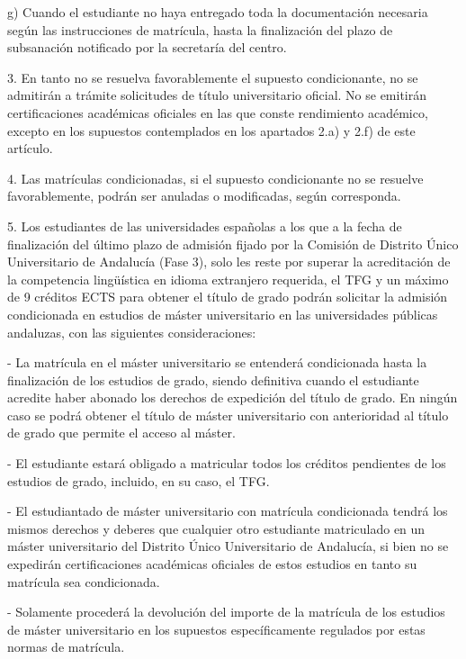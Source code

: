 \documentclass{article}
\begin{document}
\begin{itemize}
\begin{itemize}
\begin{scriptsize}
                  g) Cuando el estudiante no haya entregado toda la documentación necesaria según las instrucciones de matrícula, hasta la finalización del plazo de subsanación notificado por la secretaría del centro.

                  3. En tanto no se resuelva favorablemente el supuesto condicionante, no se admitirán a trámite solicitudes de título universitario oficial. No se emitirán certificaciones académicas oficiales en las que conste rendimiento académico, excepto en los supuestos contemplados en los apartados 2.a) y 2.f) de este artículo.

                  4. Las matrículas condicionadas, si el supuesto condicionante no se resuelve favorablemente, podrán ser anuladas o modificadas, según corresponda.

                  5. Los estudiantes de las universidades españolas a los que a la fecha de finalización del último plazo de admisión fijado por la Comisión de Distrito Único Universitario de Andalucía (Fase 3), solo les reste por superar la acreditación de la competencia lingüística en idioma extranjero requerida, el TFG y un máximo de 9 créditos ECTS para obtener el título de grado podrán solicitar la admisión condicionada en estudios de máster universitario en las universidades públicas andaluzas, con las siguientes consideraciones:

                  - La matrícula en el máster universitario se entenderá condicionada hasta la finalización de los estudios de grado, siendo definitiva cuando el estudiante acredite haber abonado los derechos de expedición del título de grado. En ningún caso se podrá obtener el título de máster universitario con anterioridad al título de grado que permite el acceso al máster.

                  - El estudiante estará obligado a matricular todos los créditos pendientes de los estudios de grado, incluido, en su caso, el TFG.

                  - El estudiantado de máster universitario con matrícula condicionada tendrá los mismos derechos y deberes que cualquier otro estudiante matriculado en un máster universitario del Distrito Único Universitario de Andalucía, si bien no se expedirán certificaciones académicas oficiales de estos estudios en tanto su matrícula sea condicionada.

                  - Solamente procederá la devolución del importe de la matrícula de los estudios de máster universitario en los supuestos específicamente regulados por estas normas de matrícula.


\end{scriptsize}
\end{itemize}
\end{itemize}
\end{document}

